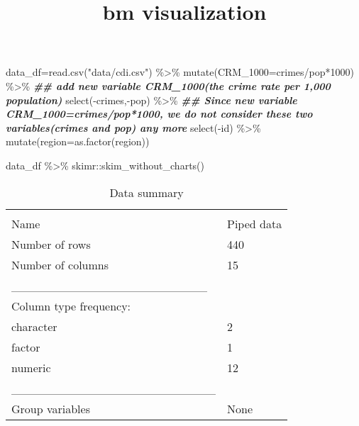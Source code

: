 \documentclass[
]{article}
\title{bm visualization}
\author{}
\date{\vspace{-2.5em}}
\newenvironment{Shaded}{\begin{snugshade}}{\end{snugshade}}
\newcommand{\AttributeTok}[1]{\textcolor[rgb]{0.77,0.63,0.00}{#1}}
\newcommand{\DecValTok}[1]{\textcolor[rgb]{0.00,0.00,0.81}{#1}}
\newcommand{\DocumentationTok}[1]{\textcolor[rgb]{0.56,0.35,0.01}{\textbf{\textit{#1}}}}
\newcommand{\FunctionTok}[1]{\textcolor[rgb]{0.00,0.00,0.00}{#1}}
\newcommand{\NormalTok}[1]{#1}
\newcommand{\OtherTok}[1]{\textcolor[rgb]{0.56,0.35,0.01}{#1}}
\newcommand{\SpecialCharTok}[1]{\textcolor[rgb]{0.00,0.00,0.00}{#1}}
\newcommand{\StringTok}[1]{\textcolor[rgb]{0.31,0.60,0.02}{#1}}
\begin{document}
\maketitle

\begin{Shaded}
\begin{Highlighting}[]
\NormalTok{data\_df}\OtherTok{=}\FunctionTok{read.csv}\NormalTok{(}\StringTok{"data/cdi.csv"}\NormalTok{) }\SpecialCharTok{\%\textgreater{}\%} 
  \FunctionTok{mutate}\NormalTok{(}\AttributeTok{CRM\_1000=}\NormalTok{crimes}\SpecialCharTok{/}\NormalTok{pop}\SpecialCharTok{*}\DecValTok{1000}\NormalTok{) }\SpecialCharTok{\%\textgreater{}\%}  \DocumentationTok{\#\# add new variable CRM\_1000(the crime rate per 1,000 population) }
  \FunctionTok{select}\NormalTok{(}\SpecialCharTok{{-}}\NormalTok{crimes,}\SpecialCharTok{{-}}\NormalTok{pop) }\SpecialCharTok{\%\textgreater{}\%} \DocumentationTok{\#\# Since new variable CRM\_1000=crimes/pop*1000, we do not consider these two variables(crimes and pop) any more}
  \FunctionTok{select}\NormalTok{(}\SpecialCharTok{{-}}\NormalTok{id) }\SpecialCharTok{\%\textgreater{}\%} 
  \FunctionTok{mutate}\NormalTok{(}\AttributeTok{region=}\FunctionTok{as.factor}\NormalTok{(region))}

\NormalTok{data\_df }\SpecialCharTok{\%\textgreater{}\%}\NormalTok{ skimr}\SpecialCharTok{::}\FunctionTok{skim\_without\_charts}\NormalTok{()}
\end{Highlighting}
\end{Shaded}

\begin{longtable}[]{@{}ll@{}}
\caption{Data summary}\tabularnewline
\toprule
& \\
\midrule
\endfirsthead
\toprule
& \\
\midrule
\endhead
Name & Piped data \\
Number of rows & 440 \\
Number of columns & 15 \\
\_\_\_\_\_\_\_\_\_\_\_\_\_\_\_\_\_\_\_\_\_\_\_ & \\
Column type frequency: & \\
character & 2 \\
factor & 1 \\
numeric & 12 \\
\_\_\_\_\_\_\_\_\_\_\_\_\_\_\_\_\_\_\_\_\_\_\_\_ & \\
Group variables & None \\
\bottomrule
\end{longtable}
\end{document}
